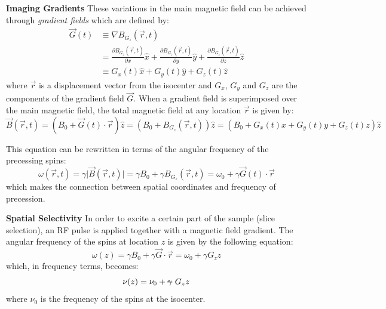 \textbf{Imaging Gradients} These variations in the main magnetic field can be achieved through \textit{gradient fields} which are defined by:
\begin{equation}
    \begin{split}
        \vec{G}(t) & \equiv \nabla B_{G_z}(\vec{r}, t) \\
                  &    =   \frac{\partial B_{G_z}(\vec{r},t)}{\partial x} \hat{x} + \frac{\partial B_{G_z}(\vec{r},t)}{\partial y} \hat{y} + \frac{\partial B_{G_z}(\vec{r},t)}{\partial z} \hat{z} \\
                  & \equiv G_x(t) \hat{x} + G_y(t) \hat{y} + G_z(t) \hat{z}
    \end{split}
\end{equation}
where $\vec{r}$ is a displacement vector from the isocenter and 
$G_x$, $G_y$ and $G_z$ are the components of the gradient field $\vec{G}$.
When a gradient field is superimposed over the main magnetic field, 
the total magnetic field at any location $\vec{r}$ is given by:
\begin{equation}
    \vec{B}(\vec{r},t) = (B_0 + \vec{G}(t) \cdot \vec{r}) \hat{z} = (B_0 + B_{G_z}(\vec{r}, t))\hat{z} = (B_0 + G_x(t)x + G_y(t)y + G_z(t)z) \hat{z}
\end{equation}

This equation can be rewritten in terms of the angular frequency of the precessing spins:
\begin{equation} \label{eq:910}
    \omega(\vec{r}, t) = \gamma \lvert \vec{B}(\vec{r}, t) \rvert = \gamma B_0 + \gamma B_{G_z} (\vec{r}, t) = \omega_0 + \gamma \vec{G}(t) \cdot \vec{r}
\end{equation}
which makes the connection between spatial coordinates and frequency of precession.

\hfill

\textbf{Spatial Selectivity}
In order to excite a certain part of the sample (slice selection), an RF pulse is applied together with a magnetic field gradient.
The angular frequency of the spins at location $z$ is given by the following equation:
\begin{equation} \label{eq:911}
    \omega(z) = \gamma B_0 + \gamma \vec{G} \cdot \vec{r} = \omega_0 + \gamma G_z z
\end{equation}
which, in frequency terms, becomes:
\begin{equation} \label{eq:912}
    \nu(z) = \nu_0 + \text{\sout{$\gamma$} } G_z z
\end{equation}
where $\nu_0$ is the frequency of the spins at the isocenter.

